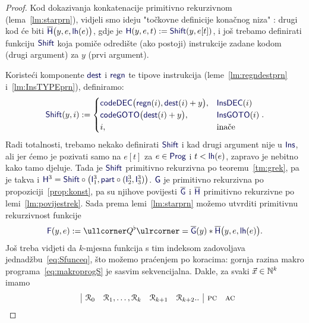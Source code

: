 \begin{proof}
Kod dokazivanja konkatenacije primitivno rekurzivnom (lema~\ref{lm:starprn}), vidjeli smo ideju "točkovne definicije konačnog niza"%
: drugi kod će biti $\overline{\f H}\bigl(y,e,\f{lh}(e)\bigr)$, gdje je $\f H(y,e,t):=\f{Shift}(y,e[t])$, i još trebamo definirati funkciju $\f{Shift}$ koja pomiče odredište (ako postoji) instrukcije zadane kodom (drugi argument) za $y$ (prvi argument).

Koristeći komponente $\f{dest}$ i $\f{regn}$ te tipove instrukcija (leme~\ref{lm:regndestprn} i~\ref{lm:InsTYPEprn}), definiramo:
\begin{equation}
    \f{Shift}(y,i):=\begin{cases}
        \f{codeDEC}\bigl(\f{regn}(i),\f{dest}(i)+y\bigr),&\f{InsDEC}(i)\\
        \f{codeGOTO}\bigl(\f{dest}(i)+y\bigr),&\f{InsGOTO}(i)\\
        i,&\text{inače}
    \end{cases}\text.
\end{equation}
    Radi totalnosti, trebamo nekako definirati $\f{Shift}$ i kad drugi argument nije u $\f{Ins}$, ali jer ćemo je pozivati samo na $e[t]$ za $e\in\f{Prog}$ i $t<\f{lh}(e)$, zapravo je nebitno kako tamo djeluje. Tada je $\f{Shift}$ primitivno rekurzivna po teoremu~\ref{tm:grek}, pa je takva i $\f H^3=\f{Shift}\circ\bigl(\f I_1^3,\f{part}\circ(\f I_2^3,\f I_3^3)\bigr)$. $\f G$ je primitivno rekurzivna po propoziciji~\ref{prop:konst}, pa su njihove povijesti $\overline{\f G}$ i $\overline{\f H}$ primitivno rekurzivne po lemi~\ref{lm:povijestrek}. Sada prema lemi~\ref{lm:starprn} %
 možemo utvrditi primitivnu rekurzivnost funkcije
\begin{equation}
    \f F(y,e):=\kprog{Q^\flat}=\overline{\f G}(y)*\overline{\f H}\bigl(y,e,\f{lh}(e)\bigr)\text.
\end{equation}
Još treba vidjeti da $k$-mjesna funkcija s tim indeksom zadovoljava jednadžbu~\eqref{eq:Sfunceq}, što možemo praćenjem po koracima: gornja razina makro programa~\eqref{eq:makroprogS} je sasvim sekvencijalna. Dakle, za svaki $\vec x\in{\mathbb N}^k$ imamo
\begin{equation}
    \begin{array}{r@{\;}l|cr@{,\dotsc,\,}lcc|cc}
        & & \reg0 & \reg1 & \reg k & \reg{k+1} & \reg{k+2}.. & \textsc{pc} & \textsc{ac}\\

\end{array}
\end{equation}
\end{proof}
